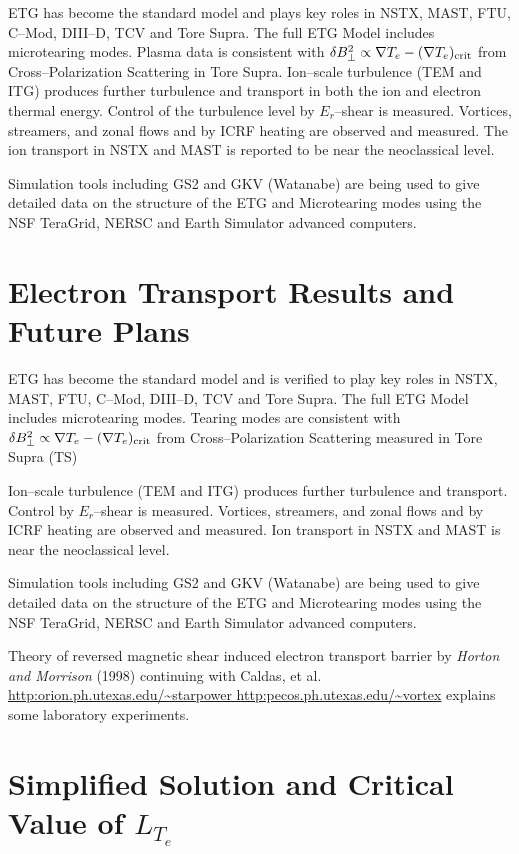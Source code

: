 \documentclass[a4paper,openany,12pt]{book}
\begin{document}
ETG  has become the standard model and plays key roles in NSTX, MAST, FTU, C--Mod, DIII--D, TCV and Tore Supra. The full ETG Model includes microtearing modes.
Plasma data is consistent with $\delta B^2_\perp\propto\nabla T_e-(\nabla T_e)_{\rm crit}$ from Cross--Polarization Scattering in Tore Supra. Ion--scale turbulence (TEM and ITG) produces further turbulence and transport in both the ion and electron thermal energy. Control of the turbulence level by $E_r$--shear is measured.  Vortices, streamers, and zonal flows and by ICRF heating are observed and measured. The ion transport in NSTX and MAST is reported to be near the neoclassical level.

Simulation tools including GS2 and GKV (Watanabe) are being used to give detailed data on the structure of the ETG and Microtearing modes using the NSF TeraGrid, NERSC and Earth Simulator advanced computers.

\section{Electron Transport Results and Future Plans}

ETG  has become the standard model and is verified to play key roles in NSTX, MAST, FTU, C--Mod, DIII--D, TCV and Tore Supra. The full ETG Model includes microtearing modes.
Tearing modes are consistent with $\delta B^2_\perp\propto\nabla T_e-(\nabla T_e)_{\rm crit}$ from Cross--Polarization Scattering measured in Tore Supra (TS)

Ion--scale turbulence (TEM and ITG) produces further turbulence and transport. Control by 
$E_r$--shear is measured. Vortices,  streamers, and zonal flows and by ICRF heating are observed and measured. Ion transport in NSTX and MAST is near the neoclassical level.



Simulation tools including GS2 and GKV (Watanabe) are being used to give detailed data on the structure of the ETG and Microtearing modes using the NSF TeraGrid, NERSC and Earth Simulator advanced computers.

Theory of reversed magnetic shear induced electron transport barrier by \emph{Horton and Morrison} (1998) continuing with Caldas, et al. \url{http:orion.ph.utexas.edu/~starpower http:pecos.ph.utexas.edu/~vortex} explains some laboratory experiments.

\section{Simplified Solution and Critical Value of $L_{T_e}$}
\end{document}
